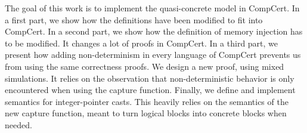 The goal of this work is to implement the quasi-concrete model in CompCert.
In a first part, we show how the definitions have been modified to fit into CompCert.
In a second part, we show how the definition of memory injection has to be modified. It changes a lot of proofs in CompCert.
In a third part, we present how adding non-determinism in every language of CompCert prevents us from using the same correctness proofs. We design a new proof, using mixed simulations. It relies on the observation that non-deterministic behavior is only encountered when using the capture function.
Finally, we define and implement semantics for integer-pointer casts. This heavily relies on the semantics of the new capture function, meant to turn logical blocks into concrete blocks when needed.
